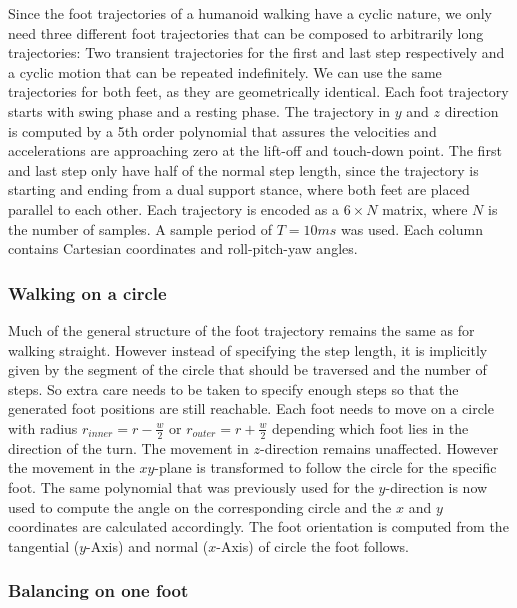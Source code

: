 \documentclass[english,ngerman]{KITreprt}
\begin{document}
Since the foot trajectories of a humanoid walking have a cyclic nature,
we only need three different foot trajectories that can be composed to
arbitrarily long trajectories: Two transient trajectories for the first
and last step respectively and a cyclic motion that can be repeated
indefinitely. We can use the same trajectories for both feet, as they
are geometrically identical. Each foot trajectory starts with swing
phase and a resting phase. The trajectory in $y$ and $z$ direction is
computed by a 5th order polynomial that assures the velocities and
accelerations are approaching zero at the lift-off and touch-down point.
The first and last step only have half of the normal step length, since
the trajectory is starting and ending from a dual support stance, where
both feet are placed parallel to each other. Each trajectory is encoded
as a $6 \times N$ matrix, where $N$ is the number of samples. A sample
period of $T = 10ms$ was used. Each column contains Cartesian
coordinates and roll-pitch-yaw angles.

\subsubsection{Walking on a circle}\label{walking-on-a-circle}

Much of the general structure of the foot trajectory remains the same as
for walking straight. However instead of specifying the step length, it
is implicitly given by the segment of the circle that should be
traversed and the number of steps. So extra care needs to be taken to
specify enough steps so that the generated foot positions are still
reachable. Each foot needs to move on a circle with radius
$r_{inner} = r - \frac{w}{2}$ or $r_{outer} = r + \frac{w}{2}$ depending
which foot lies in the direction of the turn. The movement in
$z$-direction remains unaffected. However the movement in the $xy$-plane
is transformed to follow the circle for the specific foot. The same
polynomial that was previously used for the $y$-direction is now used to
compute the angle on the corresponding circle and the $x$ and $y$
coordinates are calculated accordingly. The foot orientation is computed
from the tangential ($y$-Axis) and normal ($x$-Axis) of circle the foot
follows.

\subsubsection{Balancing on one foot}\label{balancing-on-one-foot}
\end{document}
